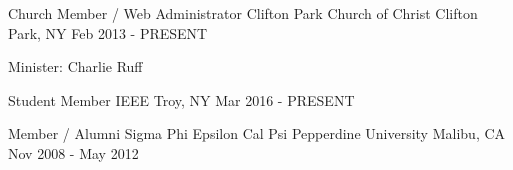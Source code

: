 

\begin{cventries}

  \cventry
    {Church Member / Web Administrator} %
    {Clifton Park Church of Christ} %
    {Clifton Park, NY} %
    {Feb 2013 - PRESENT} %
    {
      \begin{cvitems}
        \item {Minister: Charlie Ruff}
      \end{cvitems}
    }

  \cventryshort
    {Student Member} %
    {IEEE} %
    {Troy, NY} %
    {Mar 2016 - PRESENT} %



  \cventryshort
    {Member / Alumni} %
    {Sigma Phi Epsilon \dotSep Cal Psi \dotSep Pepperdine University} %
    {Malibu, CA} %
    {Nov 2008 - May 2012} %

\end{cventries}
